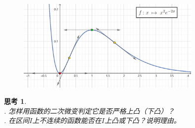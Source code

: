 \documentclass[12pt,UTF8]{ctexbook}
\newtheorem{sk}{思考}[section]
\begin{document}
\begin{figure}[H]
    \centering
    \includegraphics[width=0.8\textwidth]{tu/研究函数2.png}
\end{figure}


\begin{sk}
    \mbox{} \\
    . 怎样用函数的二次微变判定它是否严格上凸（下凸）？\\
    . 在区间$I$上不连续的函数能否在$I$上凸或下凸？说明理由。
\end{sk}
\end{document}
